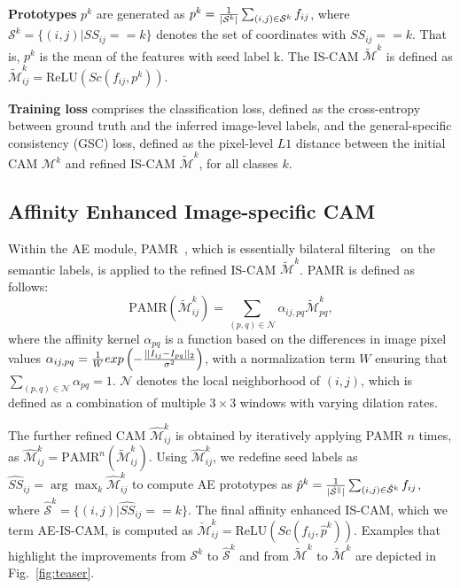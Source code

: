 \documentclass{article}
\begin{document}
\noindent
{\bf {Prototypes}} $p^{k}$ are generated as $p^{k} = {{1} \over {|\mathcal {S}^{k}|}} \sum_{(i,j) \in \mathcal{S}^{k}} {f_{ij}} $, where 
$\mathcal {S}^{k} = \{ (i,j) | SS_{ij} == k \}$ denotes the set of coordinates with $SS_{ij} == k$. That is, $p^{k}$ is the mean of the features with seed label k. The IS-CAM ${\tilde {\mathcal {M}}}^{k}$ is defined as ${\tilde {\mathcal {M}}}^{k}_{ij} = {\text {ReLU}}(Sc(f_{ij}, p^{k}))$.

\noindent
{\bf {Training loss}} comprises the classification loss, defined as the cross-entropy between ground truth and the inferred image-level labels, and the general-specific consistency (GSC) loss, defined as the pixel-level $L1$ distance between the initial CAM ${\mathcal {M}}^{k}$ and refined IS-CAM ${\tilde {\mathcal {M}}}^{k}$, for all classes $k$.

\subsection{Affinity Enhanced Image-specific CAM}
\label{sec:ae}

Within the AE module, PAMR~\cite{PAMR}, which is essentially bilateral filtering~\cite{BilateralFil} on the semantic labels, is applied to the refined IS-CAM ${\tilde {\mathcal {M}}}^{k}$. 
PAMR is defined as follows: 
\begin{equation}
    \text{PAMR}({\tilde {\mathcal {M}}}^{k}_{ij}) = \sum_{(p,q) \in \mathcal{N}} {\alpha_{ij,pq}{\tilde {\mathcal {M}}}^{k}_{pq}},
\end{equation}
where the affinity kernel $\alpha_{pq}$ is a function based on the differences in image pixel values
$\alpha_{ij,pq} = {1 \over W}exp\left(-{{||I_{ij}-I_{pq}||_{2}}\over{\sigma^{2}}}\right)$, with a normalization term $W$ ensuring that $\sum_{(p,q) \in \mathcal{N}} {\alpha_{pq}} = 1$. $\mathcal N$ denotes the local neighborhood of $(i,j)$, which is defined as a combination of multiple $3 \times 3$ windows with varying dilation rates.

The further refined CAM ${\hat {\mathcal {M}}}^{k}_{ij}$ is obtained by iteratively applying PAMR $n$ times, as ${\hat {\mathcal {M}}}^{k}_{ij} = \text{PAMR}^{n}({\tilde {\mathcal {M}}}^{k}_{ij})$. Using ${\hat {\mathcal {M}}}^{k}_{ij}$, we redefine seed labels as ${\hat {SS}}_{ij} = \arg \max_{k} {{\hat {\mathcal {M}}}^{k}_{ij}}$ to compute AE prototypes as 
${\hat {p}}^{k} = {{1} \over {|\mathcal {{\hat {S}}^{k}}|}} \sum_{(i,j) \in \mathcal{\hat {S}}^{k}} {f_{ij}} $, where $\mathcal {\hat {S}}^{k} = \{ (i,j) | {\hat {SS}}_{ij} == k \}$. The final affinity enhanced IS-CAM, which we term AE-IS-CAM, is computed as ${\check {\mathcal {M}}}^{k}_{ij} = {\text {ReLU}}(Sc(f_{ij}, {\hat p}^{k}))$. Examples that highlight the improvements from $\mathcal {S}^{k}$ to $\mathcal {\hat {S}}^{k}$ and from ${\tilde {\mathcal {M}}}^{k}$ to ${\check {\mathcal {M}}}^{k}$ are depicted in Fig.~\ref{fig:teaser}.
\end{document}
